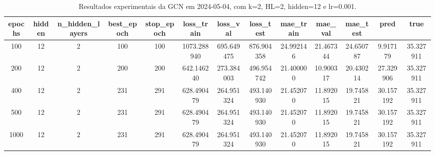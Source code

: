 \begin{table}[h]
\centering
\caption{Resultados experimentais da GCN em 2024-05-04, com k=2, HL=2, hidden=12 e lr=0.001.}
\label{tab:gcn_results_k2_hl2_h12_d20240504}
\begin{tabular}{ccccccccccccc}
\toprule
epochs & hidden & n\_hidden\_layers & best\_epoch & stop\_epoch & loss\_train & loss\_val & loss\_test & mae\_train & mae\_val & mae\_test & pred & true \\
\midrule
100 & 12 & 2 & 100 & 100 & 1073.288940 & 695.649475 & 876.904358 & 24.992146 & 21.467344 & 24.650787 & 9.917179 & 35.327911 \\
200 & 12 & 2 & 200 & 200 & 642.146240 & 273.384003 & 496.954742 & 21.400000 & 10.900317 & 20.430214 & 27.329906 & 35.327911 \\
400 & 12 & 2 & 231 & 291 & 628.490479 & 264.951324 & 493.140930 & 21.452070 & 11.892015 & 19.745821 & 30.157192 & 35.327911 \\
500 & 12 & 2 & 231 & 291 & 628.490479 & 264.951324 & 493.140930 & 21.452070 & 11.892015 & 19.745821 & 30.157192 & 35.327911 \\
1000 & 12 & 2 & 231 & 291 & 628.490479 & 264.951324 & 493.140930 & 21.452070 & 11.892015 & 19.745821 & 30.157192 & 35.327911 \\
\bottomrule
\end{tabular}
\end{table}
